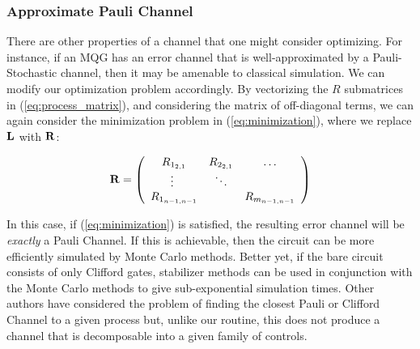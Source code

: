 \documentclass[aps,nofootinbib,pra,notitlepage,twocolumn]{revtex4-1}
\begin{document}


\subsubsection{Approximate Pauli Channel} %
\label{sub:off_diagonals}
There are other properties of a channel that one might consider optimizing. For instance, if an MQG has an error channel that is well-approximated by a Pauli-Stochastic channel, then it may be amenable to classical simulation. We can modify our optimization problem accordingly. By vectorizing the $R$ submatrices in (\ref{eq:process_matrix}), and considering the matrix of off-diagonal terms, we can again consider the minimization problem in (\ref{eq:minimization}), where we replace $\bold{L}$ with $\bold{R}$:

\begin{equation}\label{eq:vectorized_off_diagonal}
	\bold{R} = \left(\begin{array}{cccc}
		R_{1_{2,1}} & R_{2_{2,1}} & \ldots   \\ 
		\vdots\ & \ddots &    \\
		R_{1_{n-1,n-1}} &  &  R_{m_{n-1,n-1}} \\ 
	\end{array} 	
	\right)
\end{equation}

In this case, if (\ref{eq:minimization}) is satisfied, the resulting error channel will be \textit{exactly} a Pauli Channel. If this is achievable, then the circuit can be more efficiently simulated by Monte Carlo methods. Better yet, if the bare circuit consists of only Clifford gates, stabilizer methods can be used in conjunction with the Monte Carlo methods to give sub-exponential simulation times.\cite{quant-ph/9807006} Other authors have considered the problem of finding the closest Pauli or Clifford Channel to a given process \cite{Magesan2013, Puzzuoli2014} but, unlike our routine, this does not produce a channel that is decomposable into a given family of controls.


\end{document}
